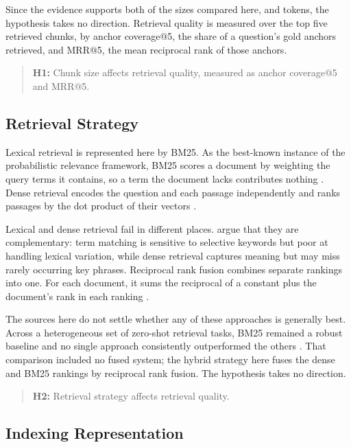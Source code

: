 Since the evidence supports both of the sizes compared here,
\thesisChunkSizeSmall{} and \thesisChunkSizeLarge{} tokens, the hypothesis
takes no direction. Retrieval quality is measured over the top five retrieved
chunks, by anchor coverage@5, the share of a question's gold anchors retrieved,
and MRR@5, the mean reciprocal rank of those anchors.

\begin{quote}
\textbf{H1:} Chunk size affects retrieval quality, measured as anchor coverage@5
and MRR@5.
\end{quote}

\subsection{Retrieval Strategy}

Lexical retrieval is represented here by BM25. As the best-known instance of the
probabilistic relevance framework, BM25 scores a document by weighting the query
terms it contains, so a term the document lacks contributes nothing
\parencite{robertson2009}. Dense retrieval encodes the question and each passage
independently and ranks passages by the dot product of their vectors
\parencite{karpukhin2020}.

Lexical and dense retrieval fail in different places. \textcite{karpukhin2020}
argue that they are complementary: term matching is sensitive to selective
keywords but poor at handling lexical variation, while dense retrieval captures
meaning but may miss rarely occurring key phrases. Reciprocal rank fusion
combines separate rankings into one. For each document, it sums the reciprocal
of a constant plus the document's rank in each ranking \parencite{cormack2009}.

The sources here do not settle whether any of these approaches is generally best.
Across a heterogeneous set of zero-shot retrieval tasks, BM25 remained a robust
baseline and no single approach consistently outperformed the others
\parencite{thakur2021}. That comparison included no fused system; the hybrid
strategy here fuses the dense and BM25 rankings by reciprocal rank fusion. The
hypothesis takes no direction.

\begin{quote}
\textbf{H2:} Retrieval strategy affects retrieval quality.
\end{quote}

\subsection{Indexing Representation}

